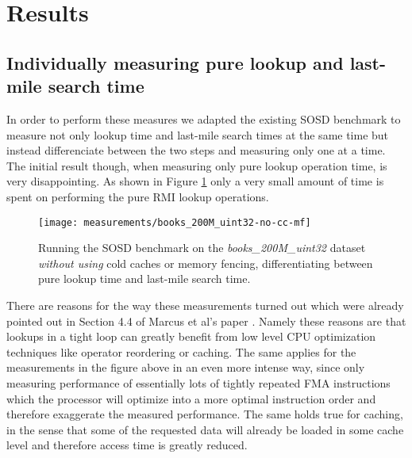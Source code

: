 \section{Results}
\label{sect:experiments:results}

\subsection{Individually measuring pure lookup and last-mile search time}
In order to perform these measures we adapted the existing SOSD benchmark to measure not only lookup time and last-mile search times at the same time but instead differenciate between the two steps and measuring only one at a time. The initial result though, when measuring only pure lookup operation time, is very disappointing. As shown in Figure \ref{fig:books_200M_uint32-no-cc-mf} only a very small amount of time is spent on performing the pure RMI lookup operations.

\captionsetup[figure]{skip=10pt} %
\begin{figure}[!ht]
  \centering
  \texttt{[image: measurements/books\_200M\_uint32-no-cc-mf]}
  \caption[Lookup and last-mile search time measures \emph{without using} cold caches and memory fencing]{
    Running the SOSD benchmark on the \emph{books\_200M\_uint32} dataset \emph{without using} cold caches or memory fencing, differentiating between pure lookup time and last-mile search time.
  }
  \label{fig:books_200M_uint32-no-cc-mf}
\end{figure}

There are reasons for the way these measurements turned out which were already pointed out in Section 4.4 of Marcus et al's paper \cite{sosd-vldb}. Namely these reasons are that lookups in a tight loop can greatly benefit from low level CPU optimization techniques like operator reordering or caching. The same applies for the measurements in the figure above in an even more intense way, since only measuring performance of essentially lots of tightly repeated FMA instructions which the processor will optimize into a more optimal instruction order and therefore exaggerate the measured performance. The same holds true for caching, in the sense that some of the requested data will already be loaded in some cache level and therefore access time is greatly reduced.

